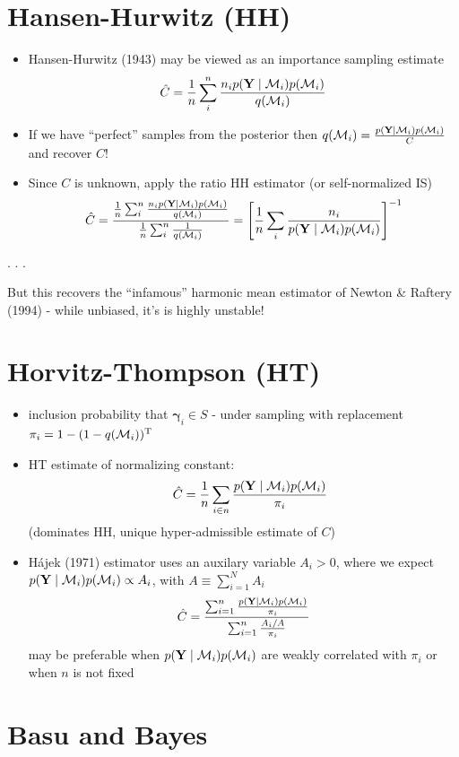 \documentclass[
]{report}
\newcommand{\1}{\mathbf{1}_n}
\newcommand{\Y}{\mathbf{Y}}
\def\M{{{\cal M}}}
\def\g{\boldsymbol{\gamma}}
\begin{document}
\section{Hansen-Hurwitz (HH)}\label{hansen-hurwitz-hh}

\begin{itemize}
\item
  Hansen-Hurwitz (1943) may be viewed as an importance sampling estimate
  \[\hat{C} = \frac{1}{n}\sum_i^n \frac{ n_i p(\Y \mid \M_i) p(\M_i)}{q(\M_i)}
  \]
\item
  If we have ``perfect'' samples from the posterior then
  \(q(\M_i) = \frac{p(\Y \mid \M_i)p(\M_i)}{C}\) and recover \(C\)!
\item
  Since \(C\) is unknown, apply the ratio HH estimator (or
  self-normalized IS) \[
  \hat{C} = \frac{\frac1 n \sum_i^n \frac{n_i p(\Y \mid \M_i) p(\M_i)}{q(\M_i)}}{ \frac1 n \sum_i^n \frac{1}{q(\M_i)}} = \left[ \frac{1}{n}  \sum_i \frac{n_i}{p(\Y \mid \M_i) p(\M_i)} \right]^{-1}
  \]
\end{itemize}

. . .

But this recovers the ``infamous'' harmonic mean estimator of Newton \&
Raftery (1994) - while unbiased, it's is highly unstable!

\section{Horvitz-Thompson (HT)}\label{horvitz-thompson-ht}

\begin{itemize}
\item
  inclusion probability that \(\g_i \in S\) - under sampling with
  replacement \(\pi_i = 1 - (1 - q(\M_i))^\text{T}\)
\item
  HT estimate of normalizing constant:
  \[\quad \hat{C} = \frac{1}{n} \sum_{i \in n} \frac{p(\Y \mid \M_i)p(\M_i)} {\pi_i}\]
  (dominates HH, unique hyper-admissible estimate of \(C\))
\item
  Hájek (1971) estimator uses an auxilary variable \(A_i > 0\), where we
  expect \(p(\Y \mid \M_i)p(\M_i) \propto A_i\), with
  \(A \equiv \sum_{i = 1}^{N} A_i\)
  \[\hat{C} = \frac{\sum_{i=1}^n \frac{p(\Y \mid \M_i)p(\M_i)} {\pi_i}} {\sum_{i=1}^n\frac{A_i/A}{\pi_i}}\]
  may be preferable when \(p(\Y \mid \M_i)p(\M_i)\) are weakly
  correlated with \(\pi_i\) or when \(n\) is not fixed
\end{itemize}

\section{Basu and Bayes}\label{basu-and-bayes}
\end{document}
